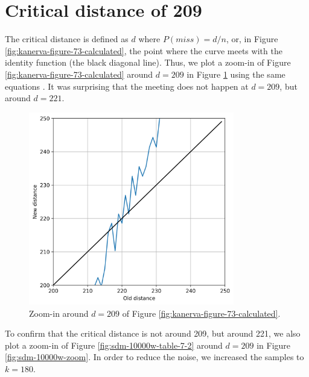 

















\section{Critical distance of 209}

The critical distance is defined as $d$ where $P(miss) = d/n$, or, in Figure \ref{fig:kanerva-figure-73-calculated}, the point where the curve meets with the identity function (the black diagonal line). Thus, we plot a zoom-in of Figure \ref{fig:kanerva-figure-73-calculated} around $d=209$ in Figure \ref{fig:figure-73-eq-zoom-in} using the same equations \citep{brogliato2014sparse}. It was surprising that the meeting does not happen at $d=209$, but around $d=221$.

\begin{figure}[!htb]
\centering\includegraphics[width=0.8\textwidth]{./images02/figure-73-eq-zoom.png}
\caption{Zoom-in around $d=209$ of Figure \ref{fig:kanerva-figure-73-calculated}.
\label{fig:figure-73-eq-zoom-in}
}
\end{figure}

To confirm that the critical distance is not around 209, but around 221, we also plot a zoom-in of Figure \ref{fig:sdm-10000w-table-7-2} around $d=209$ in Figure \ref{fig:sdm-10000w-zoom}. In order to reduce the noise, we increased the samples to $k=180$.


